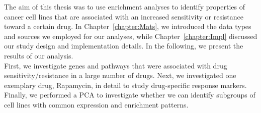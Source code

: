 
The aim of this thesis was to use enrichment analyses to identify properties of cancer cell lines that are associated with an increased sensitivity or resistance toward a certain drug. In Chapter~\ref{chapter:Mats}, we introduced the data types and sources we employed for our analyses, while Chapter~\ref{chapter:Impl} discussed our study design and implementation details. In the following, we present the results of our analysis.\\
First, we investigate genes and pathways that were associated with drug sensitivity/resistance in a large number of drugs. Next, we investigated one exemplary drug, Rapamycin, in detail to study drug-specific response markers. Finally, we performed a PCA to investigate whether we can identify subgroups of cell lines with common expression and enrichment patterns.

